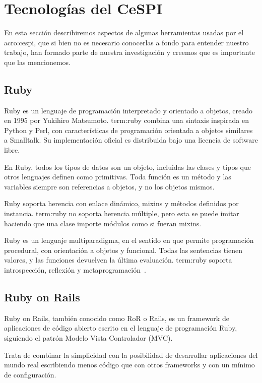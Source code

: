 \section{Tecnologías del CeSPI}
\label{anexo:A}

En esta sección describiremos aspectos de algunas herramientas usadas por el
\gls{acro:cespi}, que si bien no es necesario conocerlas a fondo para entender
nuestro trabajo, han formado parte de nuestra investigación y creemos que es
importante que las mencionemos.

\subsection{Ruby}

Ruby es un lenguaje de programación interpretado y orientado a objetos, creado
en 1995 por Yukihiro Matsumoto. \gls{term:ruby} combina una sintaxis inspirada en Python y
Perl, con características de programación orientada a objetos similares a
Smalltalk. Su implementación oficial es distribuida bajo una licencia de
software libre.

En Ruby, todos los tipos de datos son un objeto, incluidas las clases y tipos
que otros lenguajes definen como primitivas. Toda función es un método y las
variables siempre son referencias a objetos, y no los objetos mismos.

Ruby soporta herencia con enlace dinámico, mixins y métodos definidos por
instancia. \gls{term:ruby} no soporta herencia múltiple, pero esta se puede imitar
haciendo que una clase importe módulos como si fueran mixins.

Ruby es un lenguaje multiparadigma, en el sentido en que permite programación
procedural, con orientación a objetos y funcional. Todas las sentencias tienen
valores, y las funciones devuelven la última evaluación. \gls{term:ruby} soporta
introspección, reflexión y metaprogramación~\cite{ruby}.

\subsection{Ruby on Rails}

Ruby on Rails, también conocido como RoR o Rails, es un framework de
aplicaciones  de código abierto escrito en el lenguaje de programación Ruby,
siguiendo el patrón Modelo Vista Controlador (MVC).

Trata de combinar la simplicidad con la posibilidad de desarrollar aplicaciones
del mundo real escribiendo menos código que con otros frameworks y con un
mínimo de configuración.

